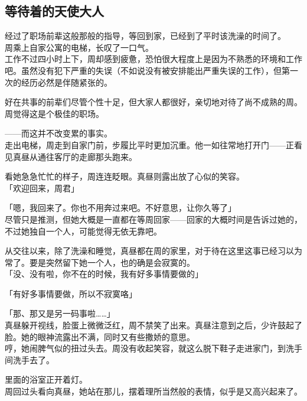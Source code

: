 \subsection{等待着的天使大人}

经过了职场前辈这般那般的指导，等回到家，已经到了平时该洗澡的时间了。\\

周乘上自家公寓的电梯，长叹了一口气。\\

工作不过四小时上下，周却感到疲惫，恐怕很大程度上是因为不熟悉的环境和工作吧。虽然没有犯下严重的失误（不如说没有被安排能出严重失误的工作），但第一次的经历必然是伴随紧张的。

好在共事的前辈们尽管个性十足，但大家人都很好，亲切地对待了尚不成熟的周。\\

周觉得这是个极佳的职场。

——而这并不改变累的事实。\\

走出电梯，周走到自家门前，步履比平时更加沉重。他一如往常地打开门——正看见真昼从通往客厅的走廊那头跑来。

看她急急忙忙的样子，周连连眨眼。真昼则露出放了心似的笑容。\\

「欢迎回来，周君」

「嗯，我回来了。你也不用奔过来吧。不好意思，让你久等了」\\

尽管只是推测，但她大概是一直都在等周回家——回家的大概时间是告诉过她的，不过她独自一个人，可能觉得无依无靠吧。

从交往以来，除了洗澡和睡觉，真昼都在周的家里，对于待在这里这事已经习以为常了。要是突然留下她一个人，也的确是会寂寞的。\\

「没、没有啦，你不在的时候，我有好多事情要做的」

「有好多事情要做，所以不寂寞咯」

「那、那又是另一码事啦……」\\

真昼躲开视线，脸蛋上微微泛红，周不禁笑了出来。真昼注意到之后，少许鼓起了脸。她的眼神流露出不满，同时又有些撒娇的意思。\\

哼，她闹脾气似的扭过头去。周没有收起笑容，就这么脱下鞋子走进家门，到洗手间洗手去了。

里面的浴室正开着灯。\\

周回过头看向真昼，她站在那儿，摆着理所当然般的表情，似乎是又高兴起来了。\\

